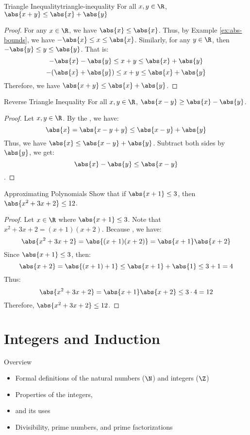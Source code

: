 \documentclass[letterpaper,12pt]{report}
\begin{document}
\begin{thmbox}{Triangle Inequality}{triangle-inequality}
	For all $x,y \in \R$, $\abs{x+y} \leq \abs{x} + \abs{y}$
	\tcblower
	\begin{proof}
		For any $x \in \R$, we have $\abs{x} \leq \abs{x}$. Thus, by Example \ref{ex:abs-bounds}, we have $-\abs{x} \leq x \leq \abs{x}$. Similarly, for any $y \in \R$, then $-\abs{y} \leq y \leq \abs{y}$. That is:
		$$-\abs{x} - \abs{y} \leq x + y \leq \abs{x} + \abs{y}$$
		$$ -(\abs{x} + \abs{y}) \leq x + y \leq \abs{x} + \abs{y} $$
		Therefore, we have $\abs{x+y} \leq \abs{x} + \abs{y}$.
	\end{proof}
\end{thmbox}

\begin{exbox}{Reverse Triangle Inequality}{}
	For all $x, y \in \R$, $\abs{x-y} \geq \abs{x} - \abs{y}$.
	\tcblower
	\begin{proof}
		Let $x, y \in \R$. By the , we have:
		\[ \abs{x} = \abs{x - y + y} \leq \abs{x-y} + \abs{y}  \]
		Thus, we have $\abs{x} \leq \abs{x-y} + \abs{y}$. Subtract both sides by $\abs{y}$, we get:
		\[ \abs{x} - \abs{y} \leq \abs{x-y} \].
	\end{proof}
\end{exbox}

\begin{exbox}{Approximating Polynomials}{}
	Show that if $\abs{x+1} \leq 3$, then $\abs{x^2 + 3x + 2} \leq 12$.
	\tcblower
	\begin{proof}
		Let $x \in \R$ where $\abs{x+1} \leq 3$. Note that $x^2 + 3x + 2 = (x+1)(x+2)$. Because , we have:
		\[ \abs{x^2+3x+2} = \abs{(x+1)(x+2)} = \abs{x+1}\abs{x+2} \]
		Since $\abs{x+1} \leq 3$, then:
		\[ \abs{x+2} = \abs{(x+1) + 1} \leq \abs{x+1} + \abs{1} \leq 3 + 1 = 4 \]
		Thus:
		\[ \abs{x^2+3x+2} = \abs{x+1}\abs{x+2} \leq 3 \cdot 4 = 12 \]
		Therefore, $\abs{x^2 + 3x + 2} \leq 12$.
	\end{proof}
\end{exbox}

\chapter{Integers and Induction}

\begin{genbox}{Overview}
	\begin{itemize}
		\item Formal definitions of the natural numbers ($\N$) and integers ($\Z$)
		\item Properties of the integers, 
		\item {} and its uses
		\item Divisibility, prime numbers, and prime factorizations
	\end{itemize}
\end{genbox}
\end{document}
